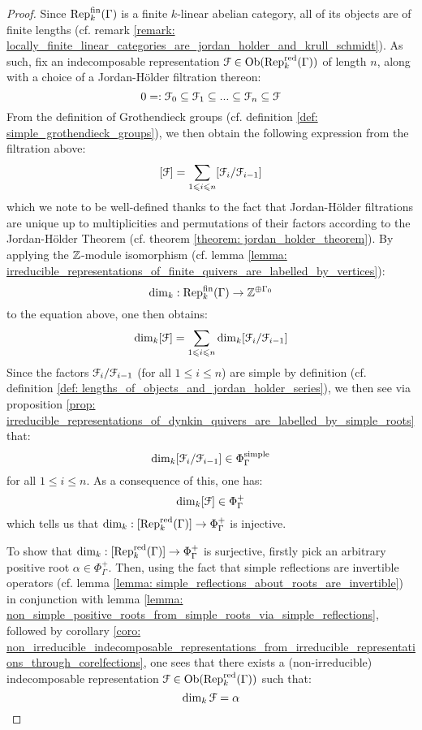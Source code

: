                 \begin{proof}
                    Since $\mathrm{Rep}_k^{\mathrm{fin}}(\Gamma)$ is a finite $k$-linear abelian category, all of its objects are of finite lengths (cf. remark \ref{remark: locally_finite_linear_categories_are_jordan_holder_and_krull_schmidt}). As such, fix an indecomposable representation $\mathcal{F} \in \mathrm{Ob}(\mathrm{Rep}_k^{\mathrm{red}}(\Gamma))$ of length $n$, along with a choice of a Jordan-H\"older filtration thereon:
                        $$0 =: \mathcal{F}_0 \subseteq \mathcal{F}_1 \subseteq ... \subseteq \mathcal{F}_n \subseteq \mathcal{F}$$
                    From the definition of Grothendieck groups (cf. definition \ref{def: simple_grothendieck_groups}), we then obtain the following expression from the filtration above:
                        $$[\mathcal{F}] = \sum_{1 \leqslant i \leqslant n} [\mathcal{F}_i/\mathcal{F}_{i - 1}]$$
                    which we note to be well-defined thanks to the fact that Jordan-H\"older filtrations are unique up to multiplicities and permutations of their factors according to the Jordan-H\"older Theorem (cf. theorem \ref{theorem: jordan_holder_theorem}). By applying the $\mathbb{Z}$-module isomorphism (cf. lemma \ref{lemma: irreducible_representations_of_finite_quivers_are_labelled_by_vertices}):
                        $$\dim_k: \mathrm{Rep}_k^{\mathrm{fin}}(\Gamma) \to \mathbb{Z}^{\oplus \Gamma_0}$$
                    to the equation above, one then obtains:
                        $$\dim_k [\mathcal{F}] = \sum_{1 \leqslant i \leqslant n} \dim_k [\mathcal{F}_i/\mathcal{F}_{i - 1}]$$
                    Since the factors $\mathcal{F}_i/\mathcal{F}_{i - 1}$ (for all $1 \leq i \leq n$) are simple by definition (cf. definition \ref{def: lengths_of_objects_and_jordan_holder_series}), we then see via proposition \ref{prop: irreducible_representations_of_dynkin_quivers_are_labelled_by_simple_roots} that:
                        $$\dim_k [\mathcal{F}_i/\mathcal{F}_{i - 1}] \in \Phi_{\Gamma}^{\mathrm{simple}}$$
                    for all $1 \leq i \leq n$. As a consequence of this, one has:
                        $$\dim_k [\mathcal{F}] \in \Phi_{\Gamma}^+$$
                    which tells us that $\dim_k: [\mathrm{Rep}_k^{\mathrm{red}}(\Gamma)] \to \Phi_{\Gamma}^+$ is injective.
                    
                    To show that $\dim_k: [\mathrm{Rep}_k^{\mathrm{red}}(\Gamma)] \to \Phi_{\Gamma}^+$ is surjective, firstly pick an arbitrary positive root $\alpha \in \Phi_{\Gamma}^+$. Then, using the fact that simple reflections are invertible operators (cf. lemma \ref{lemma: simple_reflections_about_roots_are_invertible}) in conjunction with lemma \ref{lemma: non_simple_positive_roots_from_simple_roots_via_simple_reflections}, followed by corollary \ref{coro: non_irreducible_indecomposable_representations_from_irreducible_representations_through_corelfections}, one sees that there exists a (non-irreducible) indecomposable representation $\mathcal{F} \in \mathrm{Ob}(\mathrm{Rep}_k^{\mathrm{red}}(\Gamma))$ such that:
                        $$\dim_k \mathcal{F} = \alpha$$
                \end{proof}
